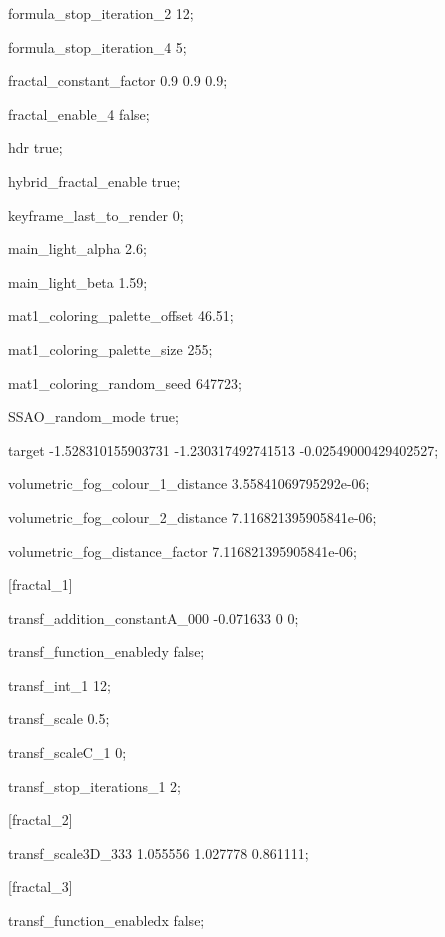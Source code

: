 formula\_stop\_iteration\_2 12;

formula\_stop\_iteration\_4 5;

fractal\_constant\_factor 0.9 0.9 0.9;

fractal\_enable\_4 false;

hdr true;

hybrid\_fractal\_enable true;

keyframe\_last\_to\_render 0;

main\_light\_alpha 2.6;

main\_light\_beta 1.59;

mat1\_coloring\_palette\_offset 46.51;

mat1\_coloring\_palette\_size 255;

mat1\_coloring\_random\_seed 647723;

SSAO\_random\_mode true;

target -1.528310155903731 -1.230317492741513 -0.02549000429402527;

volumetric\_fog\_colour\_1\_distance 3.55841069795292e-06;

volumetric\_fog\_colour\_2\_distance 7.116821395905841e-06;

volumetric\_fog\_distance\_factor 7.116821395905841e-06;

{[}fractal\_1{]}

transf\_addition\_constantA\_000 -0.071633 0 0;

transf\_function\_enabledy false;

transf\_int\_1 12;

transf\_scale 0.5;

transf\_scaleC\_1 0;

transf\_stop\_iterations\_1 2;

{[}fractal\_2{]}

transf\_scale3D\_333 1.055556 1.027778 0.861111;

{[}fractal\_3{]}

transf\_function\_enabledx false;

